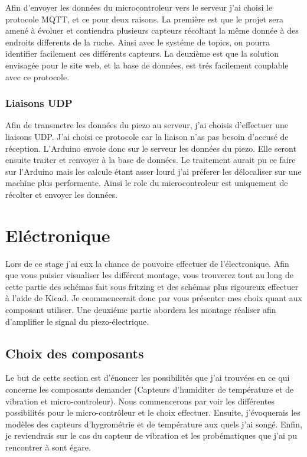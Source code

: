 \documentclass[12pt,french,a4paper]{article}
\begin{document}
Afin d'envoyer les données du microcontroleur vers le serveur j'ai choisi le protocole MQTT, et ce pour deux raisons. La première est que le projet sera amené à évoluer et contiendra plusieurs capteurs récoltant la même donnée à des endroits differents de la ruche. Ainsi avec le systéme de topics, on pourra identifier facilement ces différents capteurs. La deuxième est que la solution envisagée pour le site web, et la base de données, est trés facilement couplable avec ce protocole. 

\subsubsection{Liaisons UDP}
Afin de transmetre les données du piezo au serveur, j'ai choisis d'effectuer une liaisons UDP. J'ai choisi ce protocole car la liaison n'as pas besoin d'accusé de réception. L'Arduino envoie donc sur le serveur les données du piezo.
Elle seront ensuite traiter et renvoyer à la base de données. 
Le traitement aurait pu ce faire sur l'Arduino mais les calcule étant asser lourd j'ai préferer les délocaliser sur une machine plus performente. Ainsi le role du microcontroleur est uniquement de récolter et envoyer les données. 

\newpage
\section{Eléctronique}
Lors de ce stage j'ai eux la chance de pouvoire effectuer de l'électronique. Afin que vous puisier visualiser les différent montage, vous trouverez tout au long de cette partie des schémas fait sous fritzing et des schémas plus rigoureux effectuer à l'aide de Kicad. Je ceommencerait donc par vous présenter mes choix quant aux composant utiliser. Une deuxiéme partie abordera les montage réaliser afin d'amplifier le signal du piezo-électrique.
\subsection{Choix des composants}

Le but de cette section est d'énoncer les possibilités que j'ai trouvées en ce qui concerne les composants demander (Capteurs d'humiditer de température et de vibration et micro-controleur). Nous commencerons par voir les différentes possibilités pour le micro-contrôleur et le choix effectuer. Ensuite, j'évoquerais les modèles des capteurs d'hygrométrie et de température aux quels j'ai songé. Enfin, je reviendrais sur le cas du capteur de vibration et les probématiques que j'ai pu rencontrer à sont égare.
\end{document}
